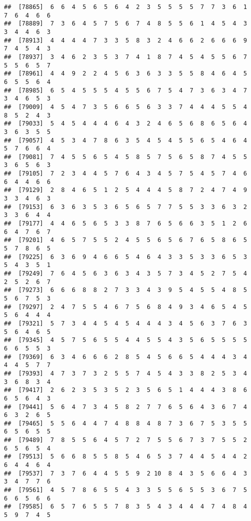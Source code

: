 \documentclass[
]{book}
\begin{document}
\begin{verbatim}
##  [78865]  6  6  4  5  6  5  6  4  2  3  5  5  5  5  7  7  3  6  1  7  6  4  6  6
##  [78889]  7  3  6  4  5  7  5  6  7  4  8  5  5  6  1  4  5  4  3  3  4  4  6  3
##  [78913]  4  4  4  4  7  3  3  5  8  3  2  4  6  6  2  6  6  6  9  7  4  5  4  3
##  [78937]  3  4  6  2  3  5  3  7  4  1  8  7  4  5  4  5  5  6  7  5  5  6  5  7
##  [78961]  4  4  9  2  2  4  5  6  3  6  3  3  5  5  8  4  6  4  5  6  5  5  6  4
##  [78985]  6  5  4  5  5  5  4  5  5  6  7  5  4  7  3  6  3  4  7  3  4  6  5  3
##  [79009]  4  5  4  7  3  5  6  6  5  6  3  3  7  4  4  4  5  5  4  8  5  2  4  3
##  [79033]  5  4  5  4  4  4  6  4  3  2  4  6  5  6  8  6  5  6  4  3  6  3  5  5
##  [79057]  4  5  3  4  7  8  6  3  5  4  5  4  5  5  6  5  4  6  4  5  7  6  6  4
##  [79081]  7  4  5  5  6  5  4  5  8  5  7  5  6  5  8  7  4  5  5  3  6  5  6  3
##  [79105]  7  2  3  4  4  5  7  6  4  3  4  5  7  5  4  5  7  4  6  6  4  4  6  6
##  [79129]  2  8  4  6  5  1  2  5  4  4  4  5  8  7  2  4  7  4  9  3  3  4  6  3
##  [79153]  6  3  6  3  5  3  6  5  6  5  7  7  5  5  3  3  6  3  2  3  3  6  4  4
##  [79177]  4  4  6  5  6  5  3  3  8  7  6  5  6  6  3  5  1  2  6  6  4  7  6  7
##  [79201]  4  6  5  7  5  5  2  4  5  5  6  5  6  7  6  5  8  6  5  5  7  8  6  5
##  [79225]  6  3  6  9  4  6  6  5  4  6  4  3  3  5  3  3  6  5  3  5  4  3  5  1
##  [79249]  7  6  4  5  6  3  6  3  4  3  5  7  3  4  5  2  7  5  4  2  5  2  6  7
##  [79273]  6  6  6  8  8  2  7  3  3  4  3  9  5  4  5  5  4  8  5  5  6  7  5  3
##  [79297]  2  4  7  5  5  4  6  7  5  6  8  4  9  3  4  6  5  4  5  5  6  4  4  4
##  [79321]  5  7  3  4  4  5  4  5  4  4  4  3  4  5  6  3  7  6  3  5  6  4  6  5
##  [79345]  4  5  7  5  6  5  5  4  4  5  5  4  3  5  6  5  5  5  5  6  6  5  5  3
##  [79369]  6  3  4  6  6  6  2  8  5  4  5  6  6  5  4  4  4  3  4  4  4  5  7  7
##  [79393]  4  7  3  7  3  2  5  5  7  4  5  4  3  3  8  2  5  3  4  3  6  8  3  4
##  [79417]  2  6  2  3  5  3  5  2  3  5  6  5  1  4  4  4  3  8  6  6  5  6  4  3
##  [79441]  5  6  4  7  3  4  5  8  2  7  7  6  5  6  4  3  6  7  4  6  3  2  6  5
##  [79465]  5  5  6  4  4  7  4  8  8  4  8  7  3  6  7  5  3  5  5  6  5  6  5  5
##  [79489]  7  8  5  5  6  4  5  7  2  7  5  5  6  7  3  7  5  5  2  6  5  6  5  4
##  [79513]  5  6  6  8  5  5  8  5  4  6  5  3  7  4  4  5  4  4  2  6  4  4  6  4
##  [79537]  7  3  7  6  4  4  5  5  9  2 10  8  4  3  5  6  6  4  3  3  4  7  7  6
##  [79561]  4  5  7  8  6  5  5  4  3  3  5  5  6  5  5  3  6  7  5  6  6  5  6  6
##  [79585]  6  5  7  6  5  5  7  8  3  5  4  3  4  4  4  7  4  8  4  5  9  7  4  5

\end{verbatim}
\end{document}
